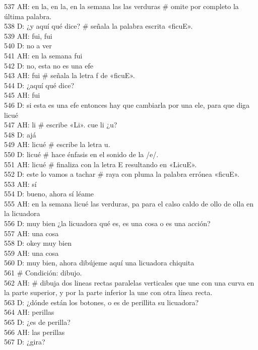 537 AH: en la, en la, en la semana las las verduras \# omite por completo la última palabra.\\
538 D: ¿y aquí qué dice? \# señala la palabra escrita «ficuE».\\
539 AH: fui, fui\\
540 D: no a ver\\
541 AH: en la semana fui\\
542 D: no, esta no es una efe\\
543 AH: fui \# señala la letra f de «ficuE».\\
544 D: ¿aquí qué dice?\\
545 AH: fui\\
546 D: si esta es una efe entonces hay que cambiarla por una ele, para que diga licué\\
547 AH: li \# escribe «Li». cue li ¿u?\\
548 D: ajá\\
549 AH: licué \# escribe la letra u.\\
550 D: licué \# hace énfasis en el sonido de la /e/.\\
551 AH: licué \# finaliza con la letra E resultando en «LicuE».\\
552 D: este lo vamos a tachar \# raya con pluma la palabra errónea «ficuE».\\
553 AH: sí\\
554 D: bueno, ahora sí léame\\
555 AH: en la semana licué las verduras, pa para el calso caldo de ollo de olla en la licuadora\\
556 D: muy bien ¿la licuadora qué es, es una cosa o es una acción?\\
557 AH: una cosa\\
558 D: okey muy bien\\
559 AH: una cosa\\
560 D: muy bien, ahora dibújeme aquí una licuadora chiquita\\
561 \# Condición: dibujo.\\
562 AH: \# dibuja dos lineas rectas paralelas verticales que une con una curva en la parte superior, y por la parte inferior la une con otra línea recta.\\
563 D: ¿dónde están los botones, o es de perillita su licuadora?\\
564 AH: perillas\\
565 D: ¿es de perilla?\\
566 AH: las perillas\\
567 D: ¿gira?\\
